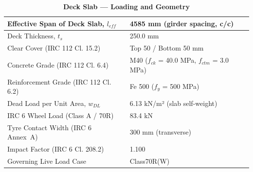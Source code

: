 \documentclass[12pt,a4paper]{report}
\numberwithin{table}{chapter}
\numberwithin{figure}{chapter}
\newcommand{\ReportTableRowGap}{6pt}
\begin{document}
\vspace{1em}
\begin{longtable}{|L{5.5cm}|p{10.0cm}|}
\caption{\textbf{Deck Slab --- Loading and Geometry}}\\
\hline
\textnormal{Effective Span of Deck Slab, $l_{eff}$} & 4585 mm (girder spacing, c/c) \\[\ReportTableRowGap]
\hline
\textnormal{Deck Thickness, $t_s$} & 250.0 mm \\[\ReportTableRowGap]
\hline
\textnormal{Clear Cover (IRC 112 Cl. 15.2)} & Top 50 / Bottom 50 mm \\[\ReportTableRowGap]
\hline
\textnormal{Concrete Grade (IRC 112 Cl. 6.4)} & M40 ($f_{ck}$ = 40.0 MPa, $f_{ctm}$ = 3.0 MPa) \\[\ReportTableRowGap]
\hline
\textnormal{Reinforcement Grade (IRC 112 Cl. 6.2)} & Fe 500 ($f_y$ = 500 MPa) \\[\ReportTableRowGap]
\hline
\textnormal{Dead Load per Unit Area, $w_{DL}$} & 6.13 kN/m² (slab self-weight) \\[\ReportTableRowGap]
\hline
\textnormal{IRC 6 Wheel Load (Class A / 70R)} & 83.4 kN \\[\ReportTableRowGap]
\hline
\textnormal{Tyre Contact Width (IRC 6 Annex~A)} & 300 mm (transverse) \\[\ReportTableRowGap]
\hline
\textnormal{Impact Factor (IRC 6 Cl. 208.2)} & 1.100 \\[\ReportTableRowGap]
\hline
\textnormal{Governing Live Load Case} & Class70R(W) \\[\ReportTableRowGap]
\hline
\end{longtable}
\end{document}
